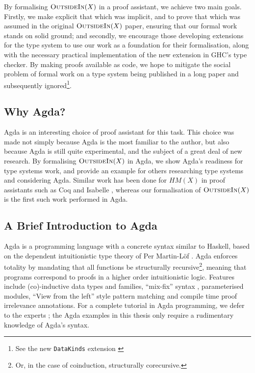 \documentclass[a4paper]{jfp}
\newcommand{\outsidein}{\textsc{OutsideIn}(X)}
\begin{document}
By formalising $\outsidein$ in a proof assistant, we achieve two main goals. Firstly, we make explicit that which was implicit, and to prove that
which was assumed in the original $\outsidein$ paper, ensuring that our formal work stands on solid ground; and secondly, we encourage those
developing extensions for the type system to use our work as a foundation for their formalisation, along with the necessary practical implementation
of the new extension in GHC's type checker. By making proofs available as code, we hope to mitigate the social problem of formal work on a type system
being published in a long paper and subsequently ignored\footnote{See the new {\tt DataKinds} extension \cite{Yorgey:2012:GHP:2103786.2103795} }. 

\subsection{Why Agda?}

Agda is an interesting choice of proof assistant for this task. This choice was made not simply because Agda is the most familiar to the author, but
also because Agda is still quite experimental, and the subject of a great deal of new research. By formalising $\outsidein$ in Agda, we show
Agda's readiness for type systems work, and provide an example for others researching type systems and considering Agda. Similar work has been done
for $HM(X)$ in proof assistants such as Coq \cite{Dubois00provingml} and Isabelle \cite{Naraschewski:1999:TIV:594135.594270}, whereas our
formalisation of $\outsidein$ is the first such work performed in Agda. 

\subsection{A Brief Introduction to Agda}
 
Agda is a programming language with a concrete syntax similar to Haskell, based on the dependent intuitionistic type theory of Per Martin-L\"of
\cite{MartinLof:1984tr}. Agda enforces totality by mandating that all functions be structurally recursive\footnote{Or, in the case of coinduction,
structurally corecursive.}, meaning that programs correspond to proofs in a higher order intuitionistic logic. Features include (co)-inductive data
types and families, ``mix-fix'' syntax \cite{springerlink:10.1007/978-3-642-24452-0_5}, parameterised modules, ``View from the left'' style pattern
matching \cite{McBride:2004:VL:967492.967496} and compile time proof irrelevance annotations. For a complete tutorial in Agda programming, we defer to
the experts \cite{conf/afp/norell08}; the Agda examples in this thesis only require a rudimentary knowledge of Agda's syntax.
\end{document}
